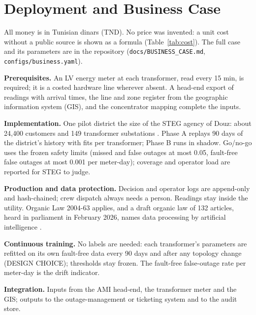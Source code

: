 \section{Deployment and Business Case}\label{sec:business}
All money is in Tunisian dinars (TND). No price was invented: a unit cost without a public source is
shown as a formula (Table~\ref{tab:cost}). The full case and its parameters are in the repository
(\texttt{docs/BUSINESS\_CASE.md}, \texttt{configs/business.yaml}).

\textbf{Prerequisites.} An LV energy meter at each transformer, read every 15 min, is required; it is a
costed hardware line wherever absent. A head-end export of readings with arrival times, the line and
zone register from the geographic information system (GIS), and the concentrator mapping complete the
inputs.

\textbf{Implementation.} One pilot district the size of the STEG agency of Douz: about 24,400
customers and 149 transformer substations \cite{managers2026douz}. Phase A replays 90 days of the
district's history with fits per transformer; Phase B runs in shadow. Go/no-go uses the frozen safety
limits (missed and false outages at most 0.05, fault-free false outages at most 0.001 per meter-day);
coverage and operator load are reported for STEG to judge.

\textbf{Production and data protection.} Decision and operator logs are append-only and hash-chained;
crew dispatch always needs a person. Readings stay inside the utility. Organic Law 2004-63 applies,
and a draft organic law of 132 articles, heard in parliament in February 2026, names data processing
by artificial intelligence \cite{businessnews2026loi}.

\textbf{Continuous training.} No labels are needed: each transformer's parameters are refitted on its
own fault-free data every 90 days and after any topology change (DESIGN CHOICE); thresholds stay
frozen. The fault-free false-outage rate per meter-day is the drift indicator.

\textbf{Integration.} Inputs from the AMI head-end, the transformer meter and the GIS; outputs to the
outage-management or ticketing system and to the audit store.

